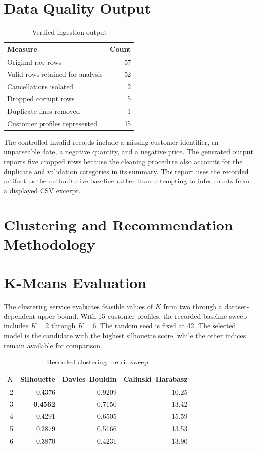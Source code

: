 \documentclass[12pt,a4paper]{report}
\begin{document}
\section{Data Quality Output}
\begin{table}[H]
\centering
\caption{Verified ingestion output}\label{tab:ingestion-output}
\begin{tabular}{p{}r}
\toprule
Measure & Count\\\midrule
Original raw rows & 57\\
Valid rows retained for analysis & 52\\
Cancellations isolated & 2\\
Dropped corrupt rows & 5\\
Duplicate lines removed & 1\\
Customer profiles represented & 15\\\bottomrule
\end{tabular}
\end{table}

The controlled invalid records include a missing customer identifier, an unparseable date, a negative quantity, and a negative price. The generated output reports five dropped rows because the cleaning procedure also accounts for the duplicate and validation categories in its summary. The report uses the recorded artifact as the authoritative baseline rather than attempting to infer counts from a displayed CSV excerpt.

\section{Clustering and Recommendation Methodology}
\section{K-Means Evaluation}
The clustering service evaluates feasible values of $K$ from two through a dataset-dependent upper bound. With 15 customer profiles, the recorded baseline sweep includes $K=2$ through $K=6$. The random seed is fixed at 42. The selected model is the candidate with the highest silhouette score, while the other indices remain available for comparison.

\begin{table}[H]
\centering
\caption{Recorded clustering metric sweep}\label{tab:metrics}
\begin{tabular}{r r r r}
\toprule
$K$ & Silhouette & Davies--Bouldin & Calinski--Harabasz\\\midrule
2 & 0.4376 & 0.9209 & 10.25\\
3 & \textbf{0.4562} & 0.7150 & 13.42\\
4 & 0.4291 & 0.6505 & 15.59\\
5 & 0.3879 & 0.5166 & 13.53\\
6 & 0.3870 & 0.4231 & 13.90\\\bottomrule
\end{tabular}
\end{table}
\end{document}
